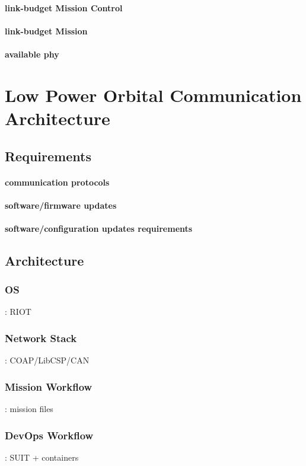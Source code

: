 \documentclass[conference]{IEEEtran}
\begin{document}
\paragraph*{link-budget Mission Control}
\paragraph*{link-budget Mission}
\paragraph*{available phy}

\section{Low Power Orbital Communication Architecture}
\label{sec:low-power-orbital-communicaiton-arch}

\subsection{Requirements}
\paragraph*{communication protocols}
\paragraph*{software/firmware updates}
\paragraph*{software/configuration updates requirements}

\subsection{Architecture}
\subsubsection{OS}: RIOT
\subsubsection{Network Stack}: COAP/LibCSP/CAN
\subsubsection{Mission Workflow}: mission files
\subsubsection{DevOps Workflow}: SUIT + containers
\end{document}
